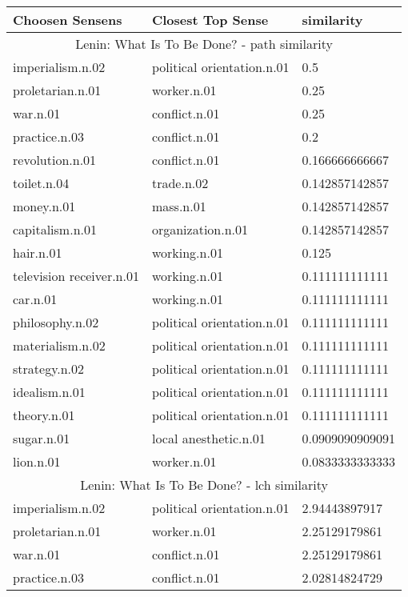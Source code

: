 
    \begin{center}
      \begin{tabular}{ | l | l | l |}
        \hline
        Choosen Sensens & Closest Top Sense & similarity  \\ \hline
\multicolumn{3}{|c|}{Lenin: What Is To Be Done? - path similarity} \\ \hline
imperialism.n.02 & political orientation.n.01 & 0.5\\ \hline
proletarian.n.01 & worker.n.01 & 0.25\\ \hline
war.n.01 & conflict.n.01 & 0.25\\ \hline
practice.n.03 & conflict.n.01 & 0.2\\ \hline
revolution.n.01 & conflict.n.01 & 0.166666666667\\ \hline
toilet.n.04 & trade.n.02 & 0.142857142857\\ \hline
money.n.01 & mass.n.01 & 0.142857142857\\ \hline
capitalism.n.01 & organization.n.01 & 0.142857142857\\ \hline
hair.n.01 & working.n.01 & 0.125\\ \hline
television receiver.n.01 & working.n.01 & 0.111111111111\\ \hline
car.n.01 & working.n.01 & 0.111111111111\\ \hline
philosophy.n.02 & political orientation.n.01 & 0.111111111111\\ \hline
materialism.n.02 & political orientation.n.01 & 0.111111111111\\ \hline
strategy.n.02 & political orientation.n.01 & 0.111111111111\\ \hline
idealism.n.01 & political orientation.n.01 & 0.111111111111\\ \hline
theory.n.01 & political orientation.n.01 & 0.111111111111\\ \hline
sugar.n.01 & local anesthetic.n.01 & 0.0909090909091\\ \hline
lion.n.01 & worker.n.01 & 0.0833333333333\\ \hline
\multicolumn{3}{|c|}{Lenin: What Is To Be Done? - lch similarity} \\ \hline
imperialism.n.02 & political orientation.n.01 & 2.94443897917\\ \hline
proletarian.n.01 & worker.n.01 & 2.25129179861\\ \hline
war.n.01 & conflict.n.01 & 2.25129179861\\ \hline
practice.n.03 & conflict.n.01 & 2.02814824729\\ \hline

\end{tabular}
\end{center}
